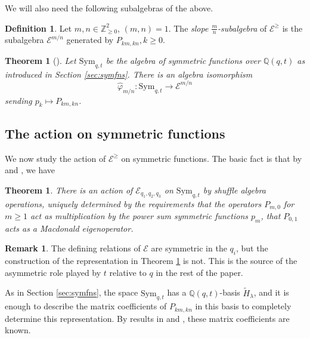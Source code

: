 \documentclass{amsart}
\numberwithin{equation}{section}
\newtheorem{theorem}[lemma]{Theorem}%
\theoremstyle{definition}
\newtheorem{remark}[lemma]{Remark}%
\newtheorem{definition}[lemma]{Definition}%
\def\Sym{{\mathrm{Sym}}}
\newcommand{\tH}{\widetilde{H}}
\newcommand{\cE}{\mathcal{E}}
\newcommand{\Z}{{\mathbb Z}}
\newcommand{\Q}{{\mathbb Q}}
\begin{document}
We will also need the following subalgebras of the above.
\begin{definition}
\label{def:slopesubalg}
Let $m,n\in \Z^2_{\geq 0}$, $(m,n)=1$. The {\em slope $\frac{m}{n}$-subalgebra} of $\cE^{\geq}$ is the subalgebra $\cE^{m/n}$ generated by $P_{km,kn}, k\geq 0$.
\end{definition}
\begin{theorem}[\cite{NegutShuffle}]
\label{thm:slopesubalg}
Let $\Sym_{q,t}$ be the algebra of symmetric functions over $\Q(q,t)$ as introduced in Section \ref{sec:symfns}. There is an algebra isomorphism
$$\widehat{\varphi}_{m/n}: \Sym_{q,t}\to \cE^{m/n}$$ sending $p_k\mapsto P_{km,kn}$.
\end{theorem}


\subsection{The action on symmetric functions}\label{subsec:fock}
We now study the action of $\cE^\geq$ on symmetric functions. 
The basic fact is that by \cite[Theorem 0.2]{SVKTheory} and \cite[Theorem 3.5]{FT}, we have
\begin{theorem}
\label{thm:fockrep}
There is an action of $\cE_{q_1,q_2,q_3}$ on $\Sym_{q,t}$ by shuffle algebra operations, uniquely determined by the requirements that the operators $P_{m,0}$ for $m \geq 1$ act as multiplication by the power sum symmetric functions $p_{m}$, that $P_{0,1}$ acts as a Macdonald eigenoperator.%
\end{theorem}
\begin{remark}\label{rmk:asymmetry}
The defining relations of $\cE$ are symmetric in the $q_i$, but the construction of the representation in Theorem \ref{thm:fockrep} is not. This is the source of the asymmetric role played by $t$ relative to $q$ in the rest of the paper. 
\end{remark}

As in Section \ref{sec:symfns}, the space $\Sym_{q,t}$ has a $\Q(q,t)$-basis $\tH_\lambda$, and it is enough to describe the matrix coefficients of $P_{km,kn}$ in this basis to completely determine this representation. By results in \cite{NegutKTheory} and \cite{FT}, these matrix coefficients are known.
\end{document}
